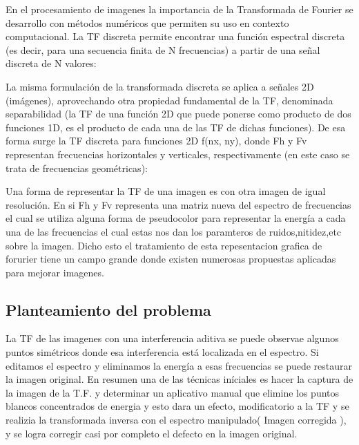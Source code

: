 \documentclass[Spanish,12pt,doublespace,german,letterpaper,dvipdfm]{article}
\begin{document}
 \tableofcontents




En el  procesamiento de imagenes la importancia de la Transformada de Fourier  se desarrollo con  métodos numéricos que permiten su uso en contexto computacional. 
La TF discreta permite encontrar una función espectral discreta (es decir, para una secuencia finita de N frecuencias) a partir de una señal discreta de N valores:


La misma formulación de la transformada discreta se aplica a señales 2D (imágenes), aprovechando otra propiedad fundamental de la TF, denominada separabilidad (la TF de una función 2D que puede ponerse como producto de dos funciones 1D, es el producto de cada una de las TF de dichas funciones).
De esa forma surge la TF discreta para funciones 2D f(nx, ny), donde Fh y Fv representan frecuencias horizontales y verticales, respectivamente (en este caso se trata de frecuencias geométricas):

 

Una forma de representar la TF de una imagen es con otra imagen de igual resolución. 
En si Fh y Fv representa una matriz nueva del espectro de frecuencias el cual se  utiliza  alguna forma de pseudocolor para representar la energía a cada una de las frecuencias el cual estas nos dan los paramteros de ruidos,nitidez,etc sobre la imagen.
Dicho esto el tratamiento de esta repesentacion grafica de forurier  tiene un campo grande donde existen numerosas propuestas aplicadas para mejorar imagenes. 

\subsection{Planteamiento del problema}
La TF de las imagenes con una interferencia aditiva se puede observae algunos  puntos simétricos donde esa interferencia está localizada en el espectro. 
Si editamos el espectro y eliminamos la energía a esas frecuencias se puede restaurar la imagen original.
En resumen una de las técnicas iníciales es hacer la captura de la imagen de la T.F. y determinar un aplicativo  manual que elimine los puntos blancos concentrados de energia y esto dara un efecto, modificatorio a  la TF y se realizia  la transformada inversa con el espectro manipulado( Imagen corregida ), y se logra corregir casi por completo el defecto en la imagen original.
\end{document}

